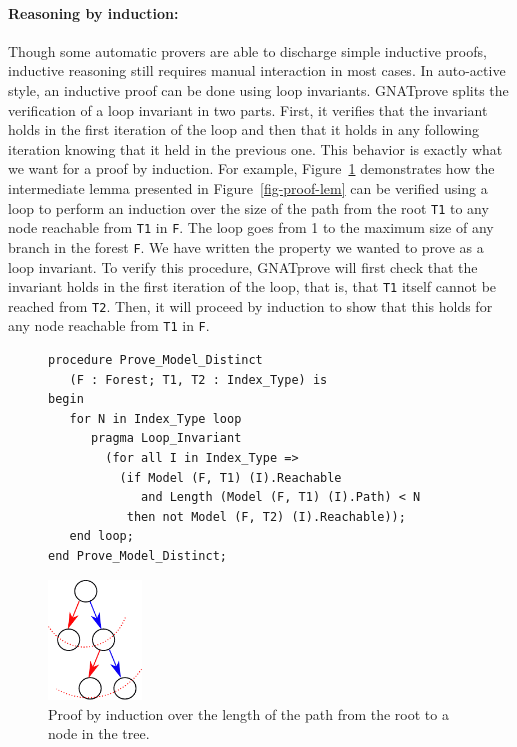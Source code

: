 \documentclass{llncs}
\newcommand{\gnatprove}{GNATprove\xspace}
\begin{document}
\paragraph{Reasoning by induction:}
Though some automatic provers are able to discharge simple inductive proofs, inductive reasoning
still requires manual interaction in most cases. In auto-active style, an inductive proof can be done
using loop invariants. \gnatprove splits the
verification of a loop invariant in two parts. First, it verifies that the invariant holds in the first iteration of the
loop and then that it holds in any following iteration knowing that it held in the previous one.
This behavior is exactly what we want for a proof by induction. For example, Figure~\ref{fig-proof-ind}
demonstrates how the intermediate lemma presented in Figure~\ref{fig-proof-lem} can be verified
using a loop to perform an induction over the size of the path from the root \texttt{T1} to any node reachable
from \texttt{T1} in \texttt{F}. The loop goes from 1 to the maximum size of any branch
in the forest \texttt{F}. We have written the property we wanted to prove as a loop invariant. To verify this procedure, \gnatprove will
first check that the invariant holds in the first iteration of the loop, that is, that \texttt{T1} itself cannot
be reached from \texttt{T2}. Then, it will proceed by induction to show that this holds for any node reachable
from \texttt{T1} in \texttt{F}.

\begin{figure}
\begin{minipage}[c]{.75\linewidth}
\begin{small}
\begin{lstlisting}
procedure Prove_Model_Distinct
   (F : Forest; T1, T2 : Index_Type) is
begin
   for N in Index_Type loop
      pragma Loop_Invariant
        (for all I in Index_Type =>
          (if Model (F, T1) (I).Reachable
             and Length (Model (F, T1) (I).Path) < N
           then not Model (F, T2) (I).Reachable));
   end loop;
end Prove_Model_Distinct;
\end{lstlisting}
\end{small}
\end{minipage}\hfill
\begin{minipage}[c]{.22\linewidth}
\begin{center}
\includegraphics[width=25mm]{induction.pdf}
\end{center}
\end{minipage}
\caption{\label{fig-proof-ind} Proof by induction over the length of the path from the root to a node in the tree.}
\end{figure}
\end{document}
